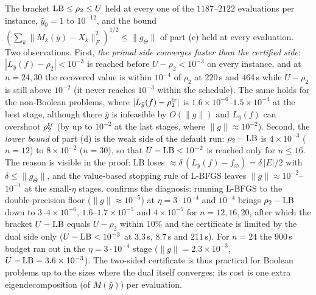 \documentclass[a4paper,11pt]{article}
\theoremstyle{plain}
\theoremstyle{definition}
\theoremstyle{remark}
\begin{document}
The bracket ${\rm LB}\le\rho_2\le U$ held at every one of the $1187$--$2122$ evaluations per instance, $\bar y_0=1$ to $10^{-12}$, and the bound $(\sum_k\|M_k(\bar y)-X_k\|_F^2)^{1/2}\le\|g_\Theta\|$ of part (c) held at every evaluation. Two observations. First, \emph{the primal side converges faster than the certified side}: $|L_{\bar y}(f)-\rho_2|<10^{-3}$ is reached before $U-\rho_2<10^{-3}$ on every instance, and at $n=24,30$ the recovered value is within $10^{-4}$ of $\rho_2$ at $220$\,s and $464$\,s while $U-\rho_2$ is still above $10^{-2}$ (it never reaches $10^{-3}$ within the schedule). The same holds for the non-Boolean problems, where $|L_{\bar y}(f)-\rho_2^{\rm tr}|$ is $1.6\times10^{-6}$--$1.5\times10^{-4}$ at the best stage, although there $\bar y$ is infeasible by $O(\|g\|)$ and $L_{\bar y}(f)$ can overshoot $\rho^{\rm tr}_2$ (by up to $10^{-2}$ at the last stages, where $\|g\|\approx10^{-2}$). Second, the \emph{lower bound} of part (d) is the weak side of the default run: $\rho_2-{\rm LB}$ is $4\times10^{-3}$ ($n=12$) to $8\times10^{-2}$ ($n=30$), so that $U-{\rm LB}<10^{-2}$ is reached only for $n\le16$. The reason is visible in the proof: LB loses $\approx\delta\,(L_{\bar y}(f)-f_\varnothing)=\delta\,|E|/2$ with $\delta\le\|g_\Theta\|$, and the value-based stopping rule of L-BFGS leaves $\|g\|\approx10^{-2}$--$10^{-1}$ at the small-$\eta$ stages.  confirms the diagnosis: running L-BFGS to the double-precision floor ($\|g\|\approx10^{-5}$) at $\eta=3\cdot10^{-4}$ and $10^{-4}$ brings $\rho_2-{\rm LB}$ down to $3$--$4\times10^{-6}$, $1.6$--$1.7\times10^{-5}$ and $4\times10^{-5}$ for $n=12,16,20$, after which the bracket $U-{\rm LB}$ equals $U-\rho_2$ within $10\%$ and the certificate is limited by the dual side only ($U-{\rm LB}<10^{-3}$ at $3.3$\,s, $8.7$\,s and $211$\,s). For $n=24$ the $900$\,s budget ran out in the $\eta=3\cdot10^{-4}$ stage ($\|g\|=2.3\times10^{-3}$, $U-{\rm LB}=3.6\times10^{-3}$). The two-sided certificate is thus practical for Boolean problems up to the sizes where the dual itself converges; its cost is one extra eigendecomposition (of $M(\bar y)$) per evaluation.
\end{document}
